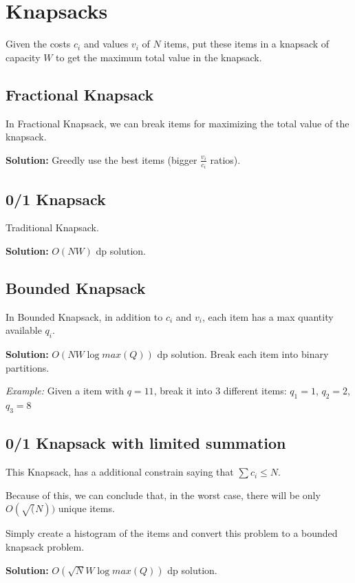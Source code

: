 \section{Knapsacks}

Given the costs $c_i$ and values $v_i$ of $N$ items, put these items in a knapsack of capacity $W$ 
to get the maximum total value in the knapsack.

\vspace{4pts}

\subsection{Fractional Knapsack}

    In Fractional Knapsack, we can break items for maximizing the total value of the knapsack.

    \textbf{Solution:} Greedly use the best items (bigger $\frac{v_i}{c_i}$ ratios).

\vspace{4pts}

\subsection{0/1 Knapsack}

    Traditional Knapsack.

    \textbf{Solution:} $O(N W)$ dp solution.


\vspace{4pts}

\subsection{Bounded Knapsack}

    In Bounded Knapsack, in addition to $c_i$ and $v_i$, each item has a max quantity available $q_i$.
    
    \textbf{Solution:} $O(N W \log{max(Q)})$ dp solution. Break each item into binary partitions.
    
    \textit{Example:} Given a item with $q = 11$, break it into $3$ different items: 
    $q_1 = 1$, $q_2 = 2$, $q_3 = 8$

\subsection{0/1 Knapsack with limited summation}

    This Knapsack, has a additional constrain saying that $\sum{c_i} \leq N$.

    Because of this, we can conclude that, in the worst case, there will be only $O(\sqrt(N))$ unique items.

    Simply create a histogram of the items and convert this problem to a bounded knapsack problem.

    \textbf{Solution:} $O(\sqrt{N} W \log{max(Q)})$ dp solution.
